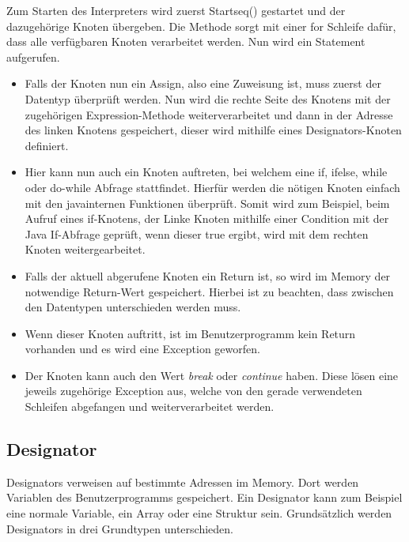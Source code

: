 Zum Starten des Interpreters wird zuerst Startseq() gestartet und der dazugehörige Knoten übergeben. Die Methode sorgt mit einer for Schleife dafür, dass alle verfügbaren Knoten verarbeitet werden. Nun wird ein Statement aufgerufen. 
\begin{itemize}
\item Falls der Knoten nun ein Assign, also eine Zuweisung ist, muss zuerst der Datentyp überprüft werden. Nun wird die rechte Seite des Knotens mit der zugehörigen Expression-Methode weiterverarbeitet und dann in der Adresse des linken Knotens gespeichert, dieser wird mithilfe eines Designators-Knoten definiert.
\item Hier kann nun auch ein Knoten auftreten, bei welchem eine if, ifelse, while oder do-while Abfrage stattfindet. Hierfür werden die nötigen Knoten einfach mit den javainternen Funktionen überprüft. Somit wird zum Beispiel, beim Aufruf eines if-Knotens, der Linke Knoten mithilfe einer Condition mit der Java If-Abfrage geprüft, wenn dieser true ergibt, wird mit dem rechten Knoten weitergearbeitet.
\item Falls der aktuell abgerufene Knoten ein Return ist, so wird im Memory der notwendige Return-Wert gespeichert. Hierbei ist zu beachten, dass zwischen den Datentypen unterschieden werden muss.
\item Wenn dieser Knoten auftritt, ist im Benutzerprogramm kein Return vorhanden und es wird eine Exception geworfen.
\item Der Knoten kann auch den Wert \textit{break} oder \textit{continue} haben. Diese lösen eine jeweils zugehörige Exception aus, welche von den gerade verwendeten Schleifen abgefangen und weiterverarbeitet werden.
\end{itemize}

\subsection{Designator}
Designators verweisen auf bestimmte Adressen im Memory. Dort werden Variablen des Benutzerprogramms gespeichert. Ein Designator kann zum Beispiel eine normale Variable, ein Array oder eine Struktur sein. Grundsätzlich werden Designators in drei Grundtypen unterschieden.

